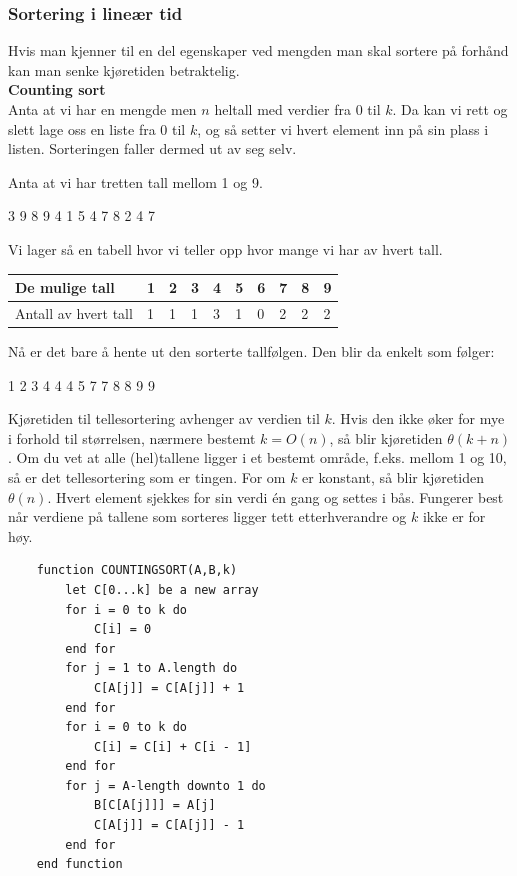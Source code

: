 \subsubsection{Sortering i lineær tid}
Hvis man kjenner til en del egenskaper ved mengden man skal sortere på forhånd kan man senke kjøretiden betraktelig.\\

\noindent \textbf{Counting sort}\\
Anta at vi har en mengde men $n$ heltall med verdier fra 0 til $k$. Da kan vi rett og slett lage oss en liste fra 0 til $k$, og så setter vi hvert element inn på sin plass i listen. Sorteringen faller dermed ut av seg selv.

\begin{boxed}
Anta at vi har tretten tall mellom 1 og 9.
\begin{center}
3 9 8 9 4 1 5 4 7 8 2 4 7
\end{center}
Vi lager så en tabell hvor vi teller opp hvor mange vi har av hvert tall.

\begin{table}[H]
    \label{tab:tellesortering}
    \centering
    \begin{tabular}{|L{10em} | L{2em}|L{2em}|L{2em}|L{2em}|L{2em}|L{2em}|L{2em}|L{2em}|L{2em}|}
        \hline
        De mulige tall & 1 & 2 & 3 & 4 & 5 & 6 & 7 & 8 & 9\\
        \hline
        Antall av hvert tall & 1 & 1 & 1 & 3 & 1 & 0 & 2 & 2 & 2\\
         \hline
    \end{tabular}
\end{table}
Nå er det bare å hente ut den sorterte tallfølgen. Den blir da enkelt som følger:
\begin{center}
1 2 3 4 4 4 5 7 7 8 8 9 9
\end{center}
\end{boxed}

\noindent Kjøretiden til tellesortering avhenger av verdien til $k$. Hvis den ikke øker for mye i forhold til størrelsen, nærmere bestemt $k = O(n)$, så blir kjøretiden $\theta(k + n)$. Om du vet at alle (hel)tallene ligger i et bestemt område, f.eks. mellom 1 og 10, så er det tellesortering som er tingen. For om $k$ er konstant, så blir kjøretiden $\theta(n)$. Hvert element sjekkes for sin verdi én gang og settes i bås. Fungerer best når verdiene på tallene som sorteres ligger tett etterhverandre og $k$ ikke er for høy.

\begin{lstlisting}
    function COUNTINGSORT(A,B,k)
	    let C[0...k] be a new array
    	for i = 0 to k do
    		C[i] = 0
    	end for
    	for j = 1 to A.length do
    		C[A[j]] = C[A[j]] + 1
    	end for
    	for i = 0 to k do
    		C[i] = C[i] + C[i - 1]
    	end for
    	for j = A-length downto 1 do
    		B[C[A[j]]] = A[j]
    		C[A[j]] = C[A[j]] - 1
    	end for
    end function
\end{lstlisting}

